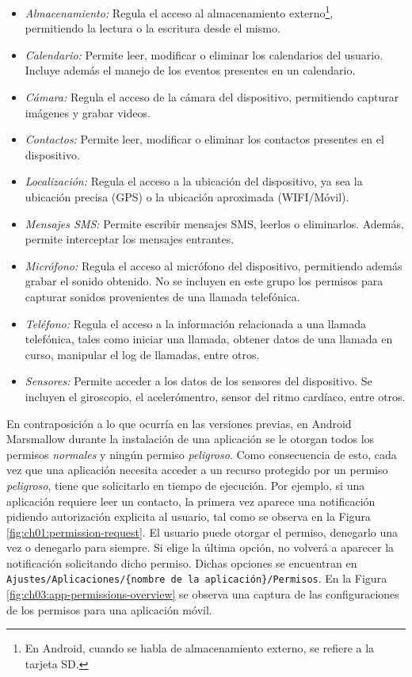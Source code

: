 \begin{itemize}
    \item \emph{Almacenamiento:} Regula el acceso al almacenamiento externo\footnote{En Android, cuando se habla de almacenamiento externo, se refiere a la tarjeta SD.}, \\permitiendo la lectura o la escritura desde el mismo.
    \item \emph{Calendario:} Permite leer, modificar o eliminar los calendarios del usuario. Incluye además el manejo de los eventos presentes en un calendario.
    \item \emph{Cámara:} Regula el acceso de la cámara del dispositivo, permitiendo capturar imágenes y grabar videos.
    \item \emph{Contactos:} Permite leer, modificar o eliminar los contactos presentes en el dispositivo.
    \item \emph{Localización:} Regula el acceso a la ubicación del dispositivo, ya sea la ubicación precisa (GPS) o la ubicación aproximada (WIFI/Móvil).
    \item \emph{Mensajes SMS:} Permite escribir mensajes SMS, leerlos o eliminarlos. Además, permite interceptar los mensajes entrantes.
    \item \emph{Micrófono:} Regula el acceso al micrófono del dispositivo, permitiendo además grabar el sonido obtenido. No se incluyen en este grupo los permisos para capturar sonidos provenientes de una llamada telefónica.
    \item \emph{Teléfono:} Regula el acceso a la información relacionada a una llamada telefónica, tales como iniciar una llamada, obtener datos de una llamada en curso, manipular el log de llamadas, entre otros.
    \item \emph{Sensores:} Permite acceder a los datos de los sensores del dispositivo. Se incluyen el giroscopio, el acelerómentro, sensor del ritmo cardíaco, entre otros.
\end{itemize}
En contraposición a lo que ocurría en las versiones previas, en Android Marsmallow durante la instalación de una aplicación se le otorgan todos los permisos \emph{normales} y ningún permiso \emph{peligroso}. Como consecuencia de esto, cada vez que una aplicación necesita acceder a un recurso protegido por un permiso \emph{peligroso}, tiene que solicitarlo en tiempo de ejecución. Por ejemplo, si una aplicación requiere leer un contacto, la primera vez aparece una notificación pidiendo autorización explicita al usuario, tal como se observa en la Figura \ref{fig:ch01:permission-request}. El usuario puede otorgar el permiso, denegarlo una vez o denegarlo para siempre. Si elige la última opción, no volverá a aparecer la notificación solicitando dicho permiso. Dichas opciones se encuentran en \texttt{Ajustes/Aplicaciones/\{nombre de la aplicación\}/Permisos}. En la Figura \ref{fig:ch03:app-permissions-overview} se observa una captura de las configuraciones de los permisos para una aplicación móvil.\\
